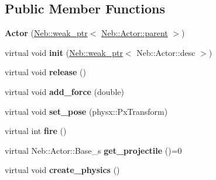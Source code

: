 \subsection*{\-Public \-Member \-Functions}
\begin{DoxyCompactItemize}
\item 
\hypertarget{classNeb_1_1Actor_1_1Actor_a265e7311ff69644021d1afb10c23359b}{{\bfseries \-Actor} (\hyperlink{classNeb_1_1weak__ptr}{\-Neb\-::weak\-\_\-ptr}$<$ \hyperlink{classNeb_1_1Actor_1_1parent}{\-Neb\-::\-Actor\-::parent} $>$)}\label{classNeb_1_1Actor_1_1Actor_a265e7311ff69644021d1afb10c23359b}

\item 
\hypertarget{classNeb_1_1Actor_1_1Actor_a80559b97a62a8b88fee0cf836a767647}{virtual void {\bfseries init} (\hyperlink{classNeb_1_1weak__ptr}{\-Neb\-::weak\-\_\-ptr}$<$ \-Neb\-::\-Actor\-::desc $>$)}\label{classNeb_1_1Actor_1_1Actor_a80559b97a62a8b88fee0cf836a767647}

\item 
\hypertarget{classNeb_1_1Actor_1_1Actor_ab691c3abd3478b30ea327842ff56e74d}{virtual void {\bfseries release} ()}\label{classNeb_1_1Actor_1_1Actor_ab691c3abd3478b30ea327842ff56e74d}

\item 
\hypertarget{classNeb_1_1Actor_1_1Actor_a49e21cfc8c2dd2877a583ae2d517f599}{virtual void {\bfseries add\-\_\-force} (double)}\label{classNeb_1_1Actor_1_1Actor_a49e21cfc8c2dd2877a583ae2d517f599}

\item 
\hypertarget{classNeb_1_1Actor_1_1Actor_a7425d4e3f9aa9aba21609062168df127}{virtual void {\bfseries set\-\_\-pose} (physx\-::\-Px\-Transform)}\label{classNeb_1_1Actor_1_1Actor_a7425d4e3f9aa9aba21609062168df127}

\item 
\hypertarget{classNeb_1_1Actor_1_1Actor_a0e9aaac73787c060d35dfe38195e1795}{virtual int {\bfseries fire} ()}\label{classNeb_1_1Actor_1_1Actor_a0e9aaac73787c060d35dfe38195e1795}

\item 
\hypertarget{classNeb_1_1Actor_1_1Actor_a3be98a9eaf8cff6d9b1cbf9ac5b2d9c6}{virtual \-Neb\-::\-Actor\-::\-Base\-\_\-s {\bfseries get\-\_\-projectile} ()=0}\label{classNeb_1_1Actor_1_1Actor_a3be98a9eaf8cff6d9b1cbf9ac5b2d9c6}

\item 
\hypertarget{classNeb_1_1Actor_1_1Actor_a281ff959835d2193a555e78f0c14295b}{virtual void {\bfseries create\-\_\-physics} ()}\label{classNeb_1_1Actor_1_1Actor_a281ff959835d2193a555e78f0c14295b}


\end{DoxyCompactItemize}
